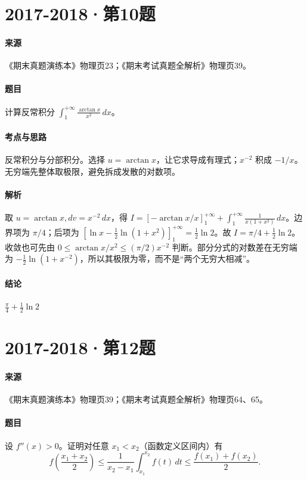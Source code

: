 \documentclass[UTF8,fontset=fandol,12pt,oneside,openany]{ctexrep}
\theoremstyle{definition}
\begin{document}
\par\addvspace{18pt}\noindent\begin{minipage}{\linewidth}
\section{2017-2018·第10题}
\label{exam:11:q23}
\paragraph{来源} 《期末真题演练本》物理页23；《期末考试真题全解析》物理页39。
\paragraph{题目}
计算反常积分 $\int_1^{+\infty}\frac{\arctan x}{x^2}\,dx$。
\end{minipage}\par
\paragraph{考点与思路}
反常积分与分部积分。选择 $u=\arctan x$，让它求导成有理式；$x^{-2}$ 积成 $-1/x$。无穷端先整体取极限，避免拆成发散的对数项。
\paragraph{解析}
取 $u=\arctan x,dv=x^{-2}\,dx$，得 $I=[-\arctan x/x]_1^{+\infty}+\int_1^{+\infty}\frac1{x(1+x^2)}\,dx$。边界项为 $\pi/4$；后项为 $[\ln x-\frac12\ln(1+x^2)]_1^{+\infty}=\frac12\ln2$。故 $I=\pi/4+\frac12\ln2$。
收敛也可先由 $0\le\arctan x/x^2\le(\pi/2)x^{-2}$ 判断。部分分式的对数差在无穷端为 $-\frac12\ln(1+x^{-2})$，所以其极限为零，而不是“两个无穷大相减”。
\paragraph{结论}
$\frac\pi4+\frac12\ln2$

\par\addvspace{18pt}\noindent\begin{minipage}{\linewidth}
\section{2017-2018·第12题}
\label{exam:11:q24}
\paragraph{来源} 《期末真题演练本》物理页39；《期末考试真题全解析》物理页64、65。
\paragraph{题目}
设 $f''(x)>0$。证明对任意 $x_1<x_2$（函数定义区间内）有
\[f\left(\frac{x_1+x_2}{2}\right)\le\frac1{x_2-x_1}\int_{x_1}^{x_2}f(t)\,dt\le\frac{f(x_1)+f(x_2)}2.\]
\end{minipage}\par
\end{document}
